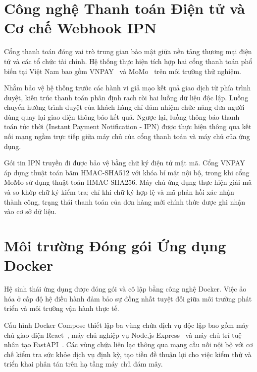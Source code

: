 \section{Công nghệ Thanh toán Điện tử và Cơ chế Webhook IPN}
Cổng thanh toán đóng vai trò trung gian bảo mật giữa nền tảng thương mại điện tử và các tổ chức tài chính. Hệ thống thực hiện tích hợp hai cổng thanh toán phổ biến tại Việt Nam bao gồm VNPAY~\cite{vnpay2024specs} và MoMo~\cite{momo2024specs} trên môi trường thử nghiệm.

Nhằm bảo vệ hệ thống trước các hành vi giả mạo kết quả giao dịch từ phía trình duyệt, kiến trúc thanh toán phân định rạch ròi hai luồng dữ liệu độc lập. Luồng chuyển hướng trình duyệt của khách hàng chỉ đảm nhiệm chức năng đưa người dùng quay lại giao diện thông báo kết quả. Ngược lại, luồng thông báo thanh toán tức thời (Instant Payment Notification - IPN) được thực hiện thông qua kết nối mạng ngầm trực tiếp giữa máy chủ của cổng thanh toán và máy chủ của ứng dụng.

Gói tin IPN truyền đi được bảo vệ bằng chữ ký điện tử mật mã. Cổng VNPAY áp dụng thuật toán băm HMAC-SHA512 với khóa bí mật nội bộ, trong khi cổng MoMo sử dụng thuật toán HMAC-SHA256. Máy chủ ứng dụng thực hiện giải mã và so khớp chữ ký kiểm tra; chỉ khi chữ ký hợp lệ và mã phản hồi xác nhận thành công, trạng thái thanh toán của đơn hàng mới chính thức được ghi nhận vào cơ sở dữ liệu.

\section{Môi trường Đóng gói Ứng dụng Docker}
Hệ sinh thái ứng dụng được đóng gói và cô lập bằng công nghệ Docker. Việc ảo hóa ở cấp độ hệ điều hành đảm bảo sự đồng nhất tuyệt đối giữa môi trường phát triển và môi trường vận hành thực tế.

Cấu hình Docker Compose thiết lập ba vùng chứa dịch vụ độc lập bao gồm máy chủ giao diện React~\cite{react2024docs}, máy chủ nghiệp vụ Node.js Express~\cite{tilkov2010node, fielding2000architectural} và máy chủ trí tuệ nhân tạo FastAPI~\cite{fastapi2024docs}. Các vùng chứa liên lạc thông qua mạng cầu nối nội bộ với cơ chế kiểm tra sức khỏe dịch vụ định kỳ, tạo tiền đề thuận lợi cho việc kiểm thử và triển khai phân tán trên hạ tầng máy chủ đám mây.

